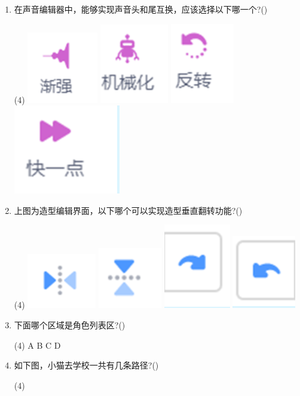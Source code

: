 \documentclass[10pt, a4paper]{article}
\begin{document}
\begin{enumerate}
        \item 在声音编辑器中，能够实现声音头和尾互换，应该选择以下哪一个?(\qquad)
        \begin{tasks}(4)
            \task \includegraphics[width=.05\textwidth]{17a.png}
            \task \includegraphics[width=.05\textwidth]{17b.png}
            \task \includegraphics[width=.04\textwidth]{17c.png}
            \task \includegraphics[width=.05\textwidth]{17d.png}
        \end{tasks}

        \item 上图为造型编辑界面，以下哪个可以实现造型垂直翻转功能?(\qquad)
        \begin{tasks}(4)
            \task \includegraphics[width=.05\textwidth]{18a.png}
            \task \includegraphics[width=.05\textwidth]{18b.png}
            \task \includegraphics[width=.04\textwidth]{18c.png}
            \task \includegraphics[width=.05\textwidth]{18d.png}
        \end{tasks}

        \item 下面哪个区域是角色列表区?(\qquad)
        \begin{tasks}(4)
            \task A
            \task B
            \task C
            \task D
        \end{tasks}

        \item 如下图，小猫去学校一共有几条路径?(\qquad)
        \begin{tasks}(4)
        \end{tasks}


\end{enumerate}
\end{document}
